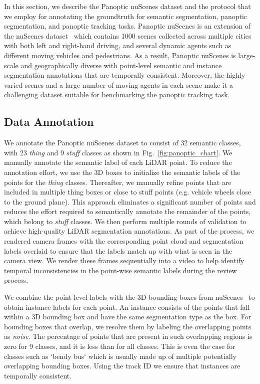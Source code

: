 \documentclass[letterpaper, 10 pt, journal, twoside]{IEEEtran}
\newcommand{\figref}[1]{Fig.~\ref{#1}}
\begin{document}
In this section, we describe the Panoptic nuScenes dataset and the protocol that we employ for annotating the groundtruth for semantic segmentation, panoptic segmentation, and panoptic tracking tasks. Panoptic nuScenes is an extension of the nuScenes dataset~\cite{caesar2020nuscenes} which contains 1000 scenes collected across multiple cities with both left and right-hand driving, and several dynamic agents such as different moving vehicles and pedestrians. As a result, Panoptic nuScenes is large-scale and geographically diverse with point-level semantic and instance segmentation annotations that are temporally consistent. Moreover, the highly varied scenes and a large number of moving agents in each scene make it a challenging dataset suitable for benchmarking the panoptic tracking task.

\vspace{-2mm}
\subsection{Data Annotation}
\label{sec:annotation_protocol}
We annotate the Panoptic nuScenes dataset to consist of 32 semantic classes, with 23 \emph{thing} and 9 \emph{stuff} classes as shown in \figref{fig:panoptic_chart}. We manually annotate the semantic label of each LiDAR point. To reduce the annotation effort, we use the 3D boxes to initialize the semantic labels of the points for the \emph{thing} classes. Thereafter, we manually refine points that are included in multiple thing boxes or close to stuff points (e.g. vehicle wheels close to the ground plane). This approach eliminates a significant number of points and reduces the effort required to semantically annotate the remainder of the points, which belong to \emph{stuff} classes. 
We then perform multiple rounds of validation to achieve high-quality LiDAR segmentation annotations. As part of the process, we rendered camera frames with the corresponding point cloud and segmentation labels overlaid to ensure that the labels match up with what is seen in the camera view. We render these frames sequentially into a video to help identify temporal inconsistencies in the point-wise semantic labels during the review process.

We combine the point-level labels with the 3D bounding boxes from nuScenes~\cite{caesar2020nuscenes} to obtain instance labels for each point. An instance consists of the points that fall within a 3D bounding box and have the same segmentation type as the box. For bounding boxes that overlap, we resolve them by labeling the overlapping points as \emph{noise}. The percentage of points that are present in such overlapping regions is zero for 9 classes, and it is less than  for all classes. This is even the case for classes such as `bendy bus` which is usually made up of multiple potentially overlapping bounding boxes. 
Using the track ID we ensure that instances are temporally consistent.
\end{document}
